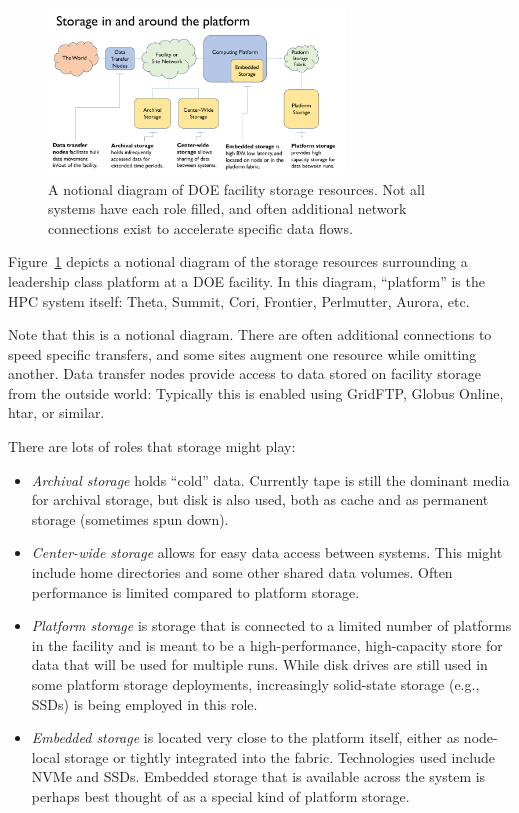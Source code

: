 \begin{figure}[t]
	\centering
	\includegraphics[width=0.70\textwidth]{projects/2.3.4-DataViz/DataViz-storage-notional-diagram.pdf}
	\caption{\label{fig:DataViz:StorageDiagram} A notional diagram of DOE
		facility storage resources. Not all systems have each role filled,
		and often additional network connections exist to accelerate specific
		data flows.}
\end{figure}


Figure~\ref{fig:DataViz:StorageDiagram} depicts a notional diagram of
the storage resources surrounding a leadership class platform at a DOE
facility. In this diagram, ``platform'' is the HPC system itself: Theta, Summit,
Cori, Frontier, Perlmutter, Aurora, etc. 

Note that this is a notional diagram. There are often additional
connections to speed specific transfers, and some sites augment one resource
while omitting another.
%
Data transfer nodes provide access to data stored on facility storage from the
outside world: Typically this is enabled using GridFTP, Globus Online, htar, or
similar.

There are lots of roles that storage might play:
\begin{itemize}
	\item \emph{Archival storage} holds ``cold'' data. Currently tape is
	still the dominant media for archival storage, but disk is also used,
	both as cache and as permanent storage (sometimes spun down).
	\item \emph{Center-wide storage} allows for easy data access between
	systems. This might include home directories and some other shared data
	volumes. Often performance is limited compared to platform storage.
	\item \emph{Platform storage} is storage that is connected to a limited
	number of platforms in the facility and is meant to be a high-performance,
	high-capacity store for data that will be used for multiple runs. While
	disk drives are still used in some platform storage deployments,
	increasingly solid-state storage (e.g., SSDs) is being employed in
	this role.
	\item \emph{Embedded storage} is located very close to the platform
	itself, either as node-local storage or tightly integrated into the
	fabric. Technologies used include NVMe and SSDs. Embedded storage that
	is available across the system is perhaps best thought of as a special 
	kind of platform storage.
\end{itemize}

